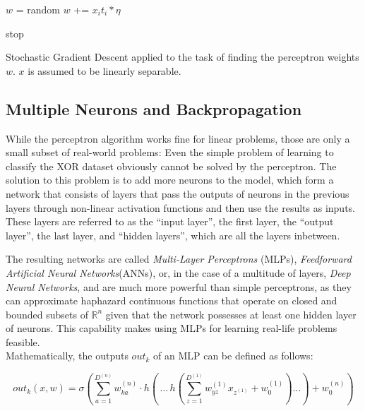 \begin {algorithm}
	\begin {algorithmic}[1]
		\State $w$ = random
					\State $w$ += $x_i t_i * \eta$
				\EndIf

					\State stop
				\EndIf
			\EndFor
		\EndWhile
	\end{algorithmic}
	\caption{Stochastic Gradient Descent applied to the task of finding the perceptron weights $w$. $x$ is assumed to be linearly separable.}
	\label{alg:perceptron_algorithm}
\end{algorithm}



		\subsection{Multiple Neurons and Backpropagation}
While the perceptron algorithm works fine for linear problems, those are only a small subset of real-world problems: Even the simple problem of learning to classify the XOR dataset obviously cannot be solved by the perceptron. The solution to this problem is to add more neurons to the model, which form a network that consists of layers that pass the outputs of neurons in the previous layers through non-linear activation functions and then use the results as inputs. These layers are referred to as the ``input layer'', the first layer, the ``output layer'', the last layer, and ``hidden layers'', which are all the layers inbetween.

The resulting networks are called \textit{Multi-Layer Perceptrons} (MLPs), \textit{Feedforward Artificial Neural Networks}(ANNs), or, in the case of a multitude of layers, \textit{Deep Neural Networks}, and are much more powerful than simple perceptrons, as they can approximate haphazard continuous functions that operate on closed and bounded subsets of $\mathbb{R}^n$ given that the network possesses at least one hidden layer of neurons. This capability makes using MLPs for learning real-life problems feasible.\cite{universal_approx}\cite{universal_approx2}\\

\noindent Mathematically, the outputs $out_k$ of an MLP can be defined as follows:

\[  out_k(x, w) = \sigma \left( \sum \limits_{a=1}^{D^{(n)}} w_{ka}^{(n)} \cdot h \left ( \,\dots\, h\left ( \sum \limits_{z=1}^{D^{(1)}} w_{yz}^{(1)} x_{z^{(1)}} + w^{(1)}_{0} \right ) \dots \right ) + w_{0}^{(n)} \right ) \]

